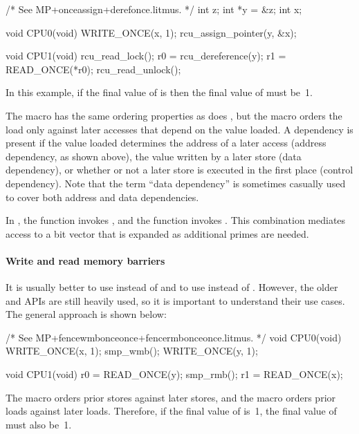 \begin{VerbatimU}
	/* See MP+onceassign+derefonce.litmus. */
	int z;
	int *y = &z;
	int x;

	void CPU0(void)
	{
		WRITE_ONCE(x, 1);
		rcu_assign_pointer(y, &x);
	}

	void CPU1(void)
	{
		rcu_read_lock();
		r0 = rcu_dereference(y);
		r1 = READ_ONCE(*r0);
		rcu_read_unlock();
	}
\end{VerbatimU}

In this example, if the final value of  is  then the final
value of  must be~1.

The  macro has the same ordering properties as does
, but the  macro orders the
load only against later accesses that depend on the value loaded.
A dependency is present if the value loaded determines the address of
a later access (address dependency, as shown above), the value written
by a later store (data dependency), or whether or not a later store is
executed in the first place (control dependency).
Note that the term ``data dependency'' is sometimes casually used to
cover both address and data dependencies.

In , the 
function invokes , and the 
function invokes .
This combination mediates access to a bit vector that is expanded as
additional primes are needed.


\paragraph{Write and read memory barriers}

It is usually better to use  instead of 
and to use  instead of .
However, the older  and  APIs are still heavily
used, so it is important to understand their use cases.
The general approach is shown below:

\begin{VerbatimU}
	/* See MP+fencewmbonceonce+fencermbonceonce.litmus. */
	void CPU0(void)
	{
		WRITE_ONCE(x, 1);
		smp_wmb();
		WRITE_ONCE(y, 1);
	}

	void CPU1(void)
	{
		r0 = READ_ONCE(y);
		smp_rmb();
		r1 = READ_ONCE(x);
	}
\end{VerbatimU}

The  macro orders prior stores against later stores, and the
 macro orders prior loads against later loads.
Therefore, if the final value of  is~1, the final value of 
must also be~1.

